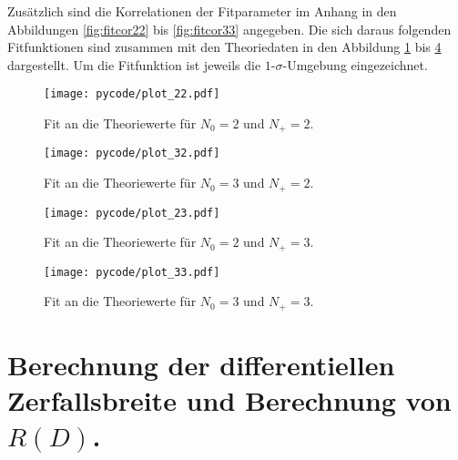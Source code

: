 Zusätzlich sind die Korrelationen der Fitparameter im Anhang in den Abbildungen \ref{fig:fitcor22} bis \ref{fig:fitcor33} angegeben.
Die sich daraus folgenden Fitfunktionen sind zusammen mit den Theoriedaten in den Abbildung \ref{fig:fit22} bis \ref{fig:fit33} dargestellt.
Um die Fitfunktion ist jeweils die $\num{1}$-$\sigma$-Umgebung eingezeichnet.
\begin{figure}
  \centering
  \texttt{[image: pycode/plot\_22.pdf]}
  \caption{Fit an die Theoriewerte für $N_0 = \num{2}$ und $N_+ = \num{2}$.}
  \label{fig:fit22}
\end{figure}
\begin{figure}
  \centering
  \texttt{[image: pycode/plot\_32.pdf]}
  \caption{Fit an die Theoriewerte für $N_0 = \num{3}$ und $N_+ = \num{2}$.}
  \label{fig:fit32}
\end{figure}
\begin{figure}
  \centering
  \texttt{[image: pycode/plot\_23.pdf]}
  \caption{Fit an die Theoriewerte für $N_0 = \num{2}$ und $N_+ = \num{3}$.}
  \label{fig:fit23}
\end{figure}
\begin{figure}
  \centering
  \texttt{[image: pycode/plot\_33.pdf]}
  \caption{Fit an die Theoriewerte für $N_0 = \num{3}$ und $N_+ = \num{3}$.}
  \label{fig:fit33}
\end{figure}

\section{Berechnung der differentiellen Zerfallsbreite und Berechnung von \texorpdfstring{$R(D)$}{R(D)}.}

